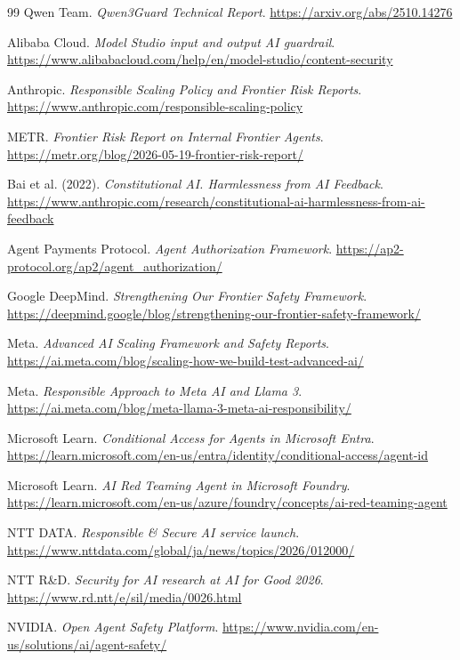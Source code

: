 \begin{thebibliography}{99}
Qwen Team. \textit{Qwen3Guard Technical Report}.
\url{https://arxiv.org/abs/2510.14276}

Alibaba Cloud. \textit{Model Studio input and output AI guardrail}.
\url{https://www.alibabacloud.com/help/en/model-studio/content-security}

Anthropic. \textit{Responsible Scaling Policy and Frontier Risk Reports}.
\url{https://www.anthropic.com/responsible-scaling-policy}

METR. \textit{Frontier Risk Report on Internal Frontier Agents}.
\url{https://metr.org/blog/2026-05-19-frontier-risk-report/}

Bai et al. (2022). \textit{Constitutional AI. Harmlessness from AI Feedback}.
\url{https://www.anthropic.com/research/constitutional-ai-harmlessness-from-ai-feedback}

Agent Payments Protocol. \textit{Agent Authorization Framework}.
\url{https://ap2-protocol.org/ap2/agent_authorization/}

Google DeepMind. \textit{Strengthening Our Frontier Safety Framework}.
\url{https://deepmind.google/blog/strengthening-our-frontier-safety-framework/}

Meta. \textit{Advanced AI Scaling Framework and Safety Reports}.
\url{https://ai.meta.com/blog/scaling-how-we-build-test-advanced-ai/}

Meta. \textit{Responsible Approach to Meta AI and Llama 3}.
\url{https://ai.meta.com/blog/meta-llama-3-meta-ai-responsibility/}

Microsoft Learn. \textit{Conditional Access for Agents in Microsoft Entra}.
\url{https://learn.microsoft.com/en-us/entra/identity/conditional-access/agent-id}

Microsoft Learn. \textit{AI Red Teaming Agent in Microsoft Foundry}.
\url{https://learn.microsoft.com/en-us/azure/foundry/concepts/ai-red-teaming-agent}

NTT DATA. \textit{Responsible \& Secure AI service launch}.
\url{https://www.nttdata.com/global/ja/news/topics/2026/012000/}

NTT R\&D. \textit{Security for AI research at AI for Good 2026}.
\url{https://www.rd.ntt/e/sil/media/0026.html}

NVIDIA. \textit{Open Agent Safety Platform}.
\url{https://www.nvidia.com/en-us/solutions/ai/agent-safety/}


\end{thebibliography}
